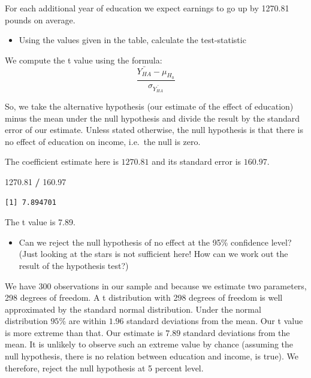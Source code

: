 \documentclass[]{article}
\newenvironment{Shaded}{\begin{snugshade}}{\end{snugshade}}
\newcommand{\FloatTok}[1]{\textcolor[rgb]{0.00,0.00,0.81}{#1}}
\newcommand{\StringTok}[1]{\textcolor[rgb]{0.31,0.60,0.02}{#1}}
\newcommand{\OperatorTok}[1]{\textcolor[rgb]{0.81,0.36,0.00}{\textbf{#1}}}
\providecommand{\tightlist}{%
  \setlength{\itemsep}{0pt}\setlength{\parskip}{0pt}}
\theoremstyle{definition}
\theoremstyle{definition}
\theoremstyle{definition}
\theoremstyle{remark}
\begin{document}
For each additional year of education we expect earnings to go up by
1270.81 pounds on average.

\begin{itemize}
\tightlist
\item
  Using the values given in the table, calculate the test-statistic
\end{itemize}

We compute the t value using the formula:
\[ \frac{\bar{Y_{HA}}-\mu_{H_{0}}}{ \sigma_{\bar{Y_{HA}}} } \]

So, we take the alternative hypothesis (our estimate of the effect of
education) minus the mean under the null hypothesis and divide the
result by the standard error of our estimate. Unless stated otherwise,
the null hypothesis is that there is no effect of education on income,
i.e.~the null is zero.

The coefficient estimate here is \(1270.81\) and its standard error is
\(160.97\).

\begin{Shaded}
\begin{Highlighting}[]
\FloatTok{1270.81} \OperatorTok{/}\StringTok{ }\FloatTok{160.97}
\end{Highlighting}
\end{Shaded}

\begin{verbatim}
[1] 7.894701
\end{verbatim}

The t value is 7.89.

\begin{itemize}
\tightlist
\item
  Can we reject the null hypothesis of no effect at the 95\% confidence
  level? (Just looking at the stars is not sufficient here! How can we
  work out the result of the hypothesis test?)
\end{itemize}

We have 300 observations in our sample and because we estimate two
parameters, 298 degrees of freedom. A t distribution with 298 degrees of
freedom is well approximated by the standard normal distribution. Under
the normal distribution \(95\%\) are within \(1.96\) standard deviations
from the mean. Our t value is more extreme than that. Our estimate is
\(7.89\) standard deviations from the mean. It is unlikely to observe
such an extreme value by chance (assuming the null hypothesis, there is
no relation between education and income, is true). We therefore, reject
the null hypothesis at 5 percent level.
\end{document}
